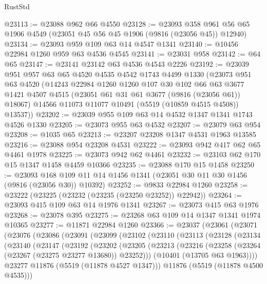 \begin{lexlean}{RustStd}
\begin{coremodule}
@23113 := @23088 @962 @66 @4550
@23128 := @23093
    @358
    @961
    @56
    @65
    @1906
    @4549
    (@23051 @45 @56 @45 @1906 (@9816 (@23056 @45)) @12940)
@23134 := @23093 @959 @109 @63 @14 @4547 @1341
@23140 := @10456 @22984 @1260 @959 @63 @4536 @4545
@23141 := @23031 @958
@23142 := @64 @65
@23147 := @23141 @23142 @63 @4536 @4543 @2226
@23192 := @23039
    @951
    @957
    @63
    @65
    @4520
    @4535
    @4542
    @1743
    @4499
    @1330
    (@23073
      @951
      @63
      @4520
      (@14243
        @22984
        @1260
        @1260
        @107
        @30
        @102
        @66
        @63
        @3677
        @1421
        @4507
        @4515
        (@23051 @61 @31 @61 @3677 (@9816 (@23056 @61)) @18067)
        @14566
        @11073
        @11077
        @10491
        (@5519 (@10859 @4515 @4508))
        @13537))
@23202 := @23039 @955 @109 @63 @14 @4532 @1347 @1341 @1743 @4526 @1330
@23205 := @23073 @955 @63 @4532
@23207 := @23079 @63 @954
@23208 := @1035 @65
@23213 := @23207 @23208 @1347 @4531 @1963 @13585
@23216 := @23088 @954 @23208 @4531
@23222 := @23093 @942 @417 @62 @65 @4461 @1978
@23225 := @23073 @942 @62 @4461
@23232 := @23103 @62 @170 @15 @1347 @1458 @4459 @10366
@23235 := @23088 @170 @15 @1458
@23250 := @23093
    @168
    @109
    @11
    @14
    @1456
    @1341
    (@23051 @30 @11 @30 @1456 (@9816 (@23056 @30)) @10392)
@23252 := @9833 @22984 @1260
@23258 := @23222 (@23225 (@23232 (@23235 (@23250 @23252)) @22942))
@23264 := @23093 @415 @109 @63 @14 @1976 @1341
@23267 := @23073 @415 @63 @1976
@23268 := @23078 @395
@23275 := @23268 @63 @109 @14 @1347 @1341 @1974 @10365
@23277 := @11871 @22984 @1260
@23366 := @23037
    (@23061
      (@23071
        (@23076
          (@23086
            (@23091
              (@23099
                (@23102
                  (@23110
                    (@23113
                      (@23128
                        (@23134
                          (@23140
                            (@23147
                              (@23192
                                (@23202
                                  (@23205
                                    (@23213
                                      (@23216
                                        (@23258 (@23264 (@23267 (@23275 @23277 @13680)) @23252)))
                                      (@10401 (@13705 @63 @1963))))
                                  @23277
                                  @11876
                                  (@5519 (@11878 @4527 @1347)))
                                @11876
                                (@5519 (@11878 @4500 @4535)))

\end{coremodule}
\end{lexlean}
